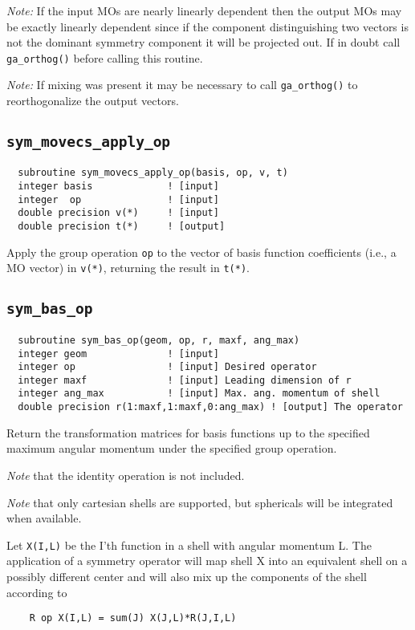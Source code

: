 {\em Note:} If the input MOs are nearly linearly dependent then the
output MOs may be exactly linearly dependent since if the component
distinguishing two vectors is not the dominant symmetry component it
will be projected out.  If in doubt call \verb+ga_orthog()+ before
calling this routine.

{\em Note:} If mixing was present it may be necessary to call
\verb+ga_orthog()+ to reorthogonalize the output vectors.

\subsection{{\tt sym\_movecs\_apply\_op}}
\begin{verbatim}
  subroutine sym_movecs_apply_op(basis, op, v, t)
  integer basis             ! [input]
  integer  op               ! [input]
  double precision v(*)     ! [input]
  double precision t(*)     ! [output]
\end{verbatim}
Apply the group operation \verb+op+ to the vector of basis function
coefficients (i.e., a MO vector) in \verb+v(*)+, returning the result
in \verb+t(*)+.

\subsection{{\tt sym\_bas\_op}}
\begin{verbatim}
  subroutine sym_bas_op(geom, op, r, maxf, ang_max)
  integer geom              ! [input]
  integer op                ! [input] Desired operator
  integer maxf              ! [input] Leading dimension of r
  integer ang_max           ! [input] Max. ang. momentum of shell
  double precision r(1:maxf,1:maxf,0:ang_max) ! [output] The operator
\end{verbatim}
Return the transformation matrices for basis functions up to the
specified maximum angular momentum under the specified group
operation.

{\em Note} that the identity operation is not included.

{\em Note} that only cartesian shells are supported, but sphericals
will be integrated when available.

Let \verb+X(I,L)+ be the I'th function in a shell with angular
momentum L.  The application of a symmetry operator will
map shell X into an equivalent shell on a possibly different
center and will also mix up the components of the shell
according to
\begin{verbatim}
    R op X(I,L) = sum(J) X(J,L)*R(J,I,L)
\end{verbatim}

